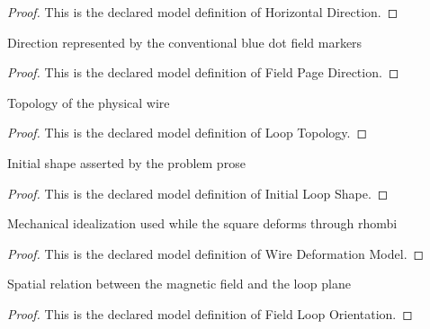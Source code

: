 \begin{proof}
  This is the declared model definition of Horizontal Direction.
\end{proof}
\begin{definition}
  \label{def:physics:phyx-mini-0884:phyxminiproblems-problemphyxmini0884-fieldpagedirection}
  Direction represented by the conventional blue dot field markers
\end{definition}
\begin{proof}
  This is the declared model definition of Field Page Direction.
\end{proof}
\begin{definition}
  \label{def:physics:phyx-mini-0884:phyxminiproblems-problemphyxmini0884-looptopology}
  Topology of the physical wire
\end{definition}
\begin{proof}
  This is the declared model definition of Loop Topology.
\end{proof}
\begin{definition}
  \label{def:physics:phyx-mini-0884:phyxminiproblems-problemphyxmini0884-initialloopshape}
  Initial shape asserted by the problem prose
\end{definition}
\begin{proof}
  This is the declared model definition of Initial Loop Shape.
\end{proof}
\begin{definition}
  \label{def:physics:phyx-mini-0884:phyxminiproblems-problemphyxmini0884-wiredeformationmodel}
  Mechanical idealization used while the square deforms through rhombi
\end{definition}
\begin{proof}
  This is the declared model definition of Wire Deformation Model.
\end{proof}
\begin{definition}
  \label{def:physics:phyx-mini-0884:phyxminiproblems-problemphyxmini0884-fieldlooporientation}
  Spatial relation between the magnetic field and the loop plane
\end{definition}
\begin{proof}
  This is the declared model definition of Field Loop Orientation.
\end{proof}
